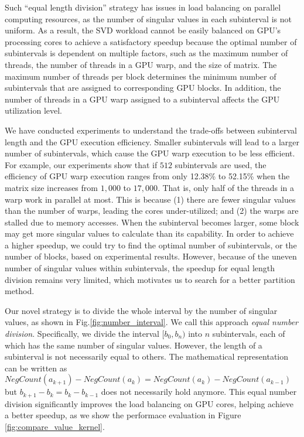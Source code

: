 Such ``equal length division'' strategy has issues in load balancing on 
parallel computing resources, as the number of singular values in each
subinterval is not uniform. As a result,
the SVD workload cannot be easily balanced on GPU's processing cores to achieve a satisfactory speedup because the optimal number of subintervals is dependent on multiple factors, such as the maximum number of threads, the number of threads in a GPU warp, and the size of matrix.
The maximum number of threads per block determines the minimum number
of subintervals that are assigned to corresponding GPU blocks.
In addition, the number of threads in a GPU warp assigned to a subinterval affects the GPU utilization level.

We have conducted experiments to understand the trade-offs between subinterval length and the GPU execution efficiency. 
Smaller subintervals will lead to a larger number of subintervals, which cause the GPU warp execution to be less efficient. 
For example, our experiments show that if $512$ subintervals are used, the efficiency of GPU warp execution ranges from only 12.38\% to 52.15\% when the matrix size increases from $1,000$ to $17,000$.
That is, only half of the threads in a warp work in parallel at most. This is because  (1)
 there are fewer singular values than the number of warps, leading the cores under-utilized; and 
(2) the warps are stalled due to memory accesses.
When the subinterval becomes larger, some block may get more singular values to calculate than its capability.
In order to achieve a higher speedup, we could try to find the optimal number of subintervals, or the number of blocks, based on experimental results. 
However, because of the uneven number of singular values within subintervals, the speedup for equal length division remains very limited, which motivates us to search for a better partition method.

Our novel strategy is to divide the whole interval by the number of singular values, as shown in Fig.\ref{fig:number_interval}. We call this approach {\it equal number division}. 
Specifically, we divide the interval $[b_0,b_n)$ into $n$ subintervals, each of which has the same number of singular values. 
However, the length of a subinterval is not necessarily equal to others.
The mathematical representation can be written as $NegCount(a_{k+1})-NegCount(a_{k})=NegCount(a_{k})-NegCount(a_{k-1})$ but $b_{k+1}-b_k = b_{k}-b_{k-1}$ does not necessarily hold anymore.
This equal number division significantly improves the load balancing on GPU cores, helping achieve a better speedup, as we show the performace evaluation in Figure \ref{fig:compare_value_kernel}.

